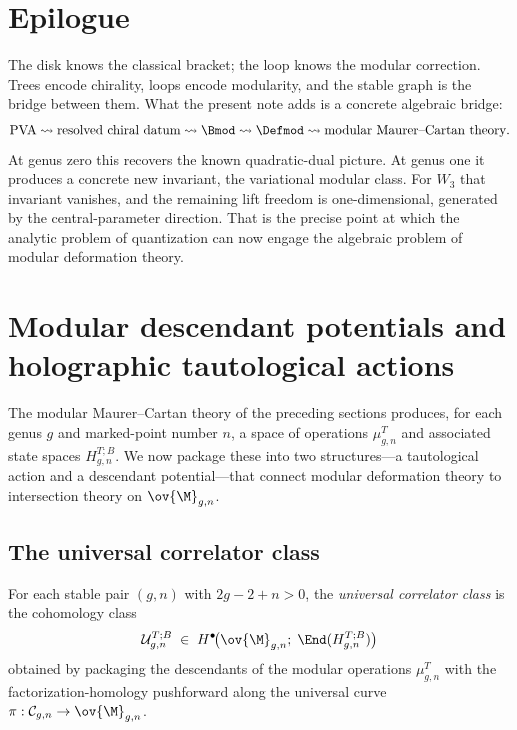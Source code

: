 \section*{Epilogue}

The disk knows the classical bracket; the loop knows the modular correction. Trees encode
chirality, loops encode modularity, and the stable graph is the bridge between them.
What the present note adds is a concrete algebraic bridge:
\[
\text{PVA}
\rightsquigarrow
\text{resolved chiral datum}
\rightsquigarrow
\Bmod
\rightsquigarrow
\Defmod
\rightsquigarrow
\text{modular Maurer--Cartan theory}.
\]
At genus zero this recovers the known quadratic-dual picture. At genus one it produces
a concrete new invariant, the variational modular class. For $W_3$ that invariant vanishes,
and the remaining lift freedom is one-dimensional, generated by the central-parameter
direction. That is the precise point at which the analytic problem of quantization can
now engage the algebraic problem of modular deformation theory.

\section{Modular descendant potentials and holographic tautological actions}
\label{sec:modular-descendant-potentials}

The modular Maurer--Cartan theory of the preceding sections produces, for each genus $g$
and marked-point number $n$, a space of operations $\mu_{g,n}^T$ and associated state
spaces $H_{g,n}^{T;B}$.  We now package these into two structures---a tautological action
and a descendant potential---that connect modular deformation theory to intersection
theory on $\ov{\M}_{g,n}$.

\subsection{The universal correlator class}
\label{subsec:universal-correlator-class}

\begin{definition}
\label{def:universal-correlator-class}
For each stable pair $(g,n)$ with $2g-2+n > 0$, the \emph{universal correlator class} is
the cohomology class
\begin{equation}
\label{eq:universal-correlator-class}
\mathcal{U}_{g,n}^{T;B}
\;\in\;
H^\bullet\!\bigl(\ov{\M}_{g,n};\;\End(H_{g,n}^{T;B})\bigr)
\end{equation}
obtained by packaging the descendants of the modular operations $\mu_{g,n}^T$ with the
factorization-homology pushforward along the universal curve
$\pi: \mathcal{C}_{g,n} \to \ov{\M}_{g,n}$.
\end{definition}

